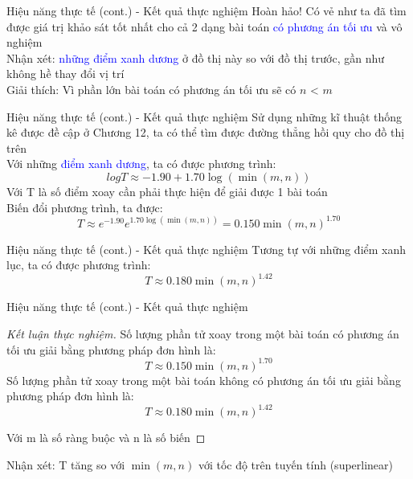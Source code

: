 \documentclass[10pt]{beamer}
\begin{document}
\begin{frame}[fragile]{Hiệu năng thực tế (cont.) - Kết quả thực nghiệm}
Hoàn hảo! Có vẻ như ta đã tìm được giá trị khảo sát tốt nhất cho cả 2 dạng bài toán \textcolor{blue}{có phương án tối ưu} và \textcolor{codegreen}{vô nghiệm}\\
Nhận xét: \textcolor{blue}{những điểm xanh dương} ở đồ thị này so với đồ thị trước, gần như không hề thay đổi vị trí\\
Giải thích: Vì phần lớn bài toán có phương án tối ưu sẽ có $n$ < $m$
\end{frame}

\begin{frame}[fragile]{Hiệu năng thực tế (cont.) - Kết quả thực nghiệm}
Sử dụng những kĩ thuật thống kê được đề cập ở Chương 12, ta có thể tìm được đường thẳng hồi quy cho đồ thị trên\\
Với những \textcolor{blue}{điểm xanh dương}, ta có được phương trình:
$$
log T \approx -1.90 + 1.70\log(\min(m, n))
$$
Với T là số điểm xoay cần phải thực hiện để giải được 1 bài toán\\
Biến đổi phương trình, ta được:
$$
T \approx e^{-1.90}e^{1.70\log(\min(m, n))} = 0.150\min(m, n)^{1.70}
$$
\end{frame}

\begin{frame}[fragile]{Hiệu năng thực tế (cont.) - Kết quả thực nghiệm}
Tương tự với những \textcolor{codegreen}{điểm xanh lục}, ta có được phương trình:
$$
T \approx 0.180\min(m, n)^{1.42}
$$
\end{frame}

\begin{frame}{Hiệu năng thực tế (cont.) - Kết quả thực nghiệm}
\begin{proof}[Kết luận thực nghiệm]
Số lượng phần tử xoay trong một bài toán có phương án tối ưu  giải bằng phương pháp đơn hình là:
$$
\displaystyle
T \approx 0.150\min(m, n)^{1.70}
$$
Số lượng phần tử xoay trong một bài toán không có phương án tối ưu giải bằng phương pháp đơn hình là:
$$
\displaystyle
T \approx 0.180\min(m, n)^{1.42}
$$
 
Với m là số ràng buộc và n là số biến
\end{proof}

Nhận xét: T tăng so với $\min(m, n)$ với tốc độ trên tuyến tính (superlinear)

\end{frame}
\end{document}
